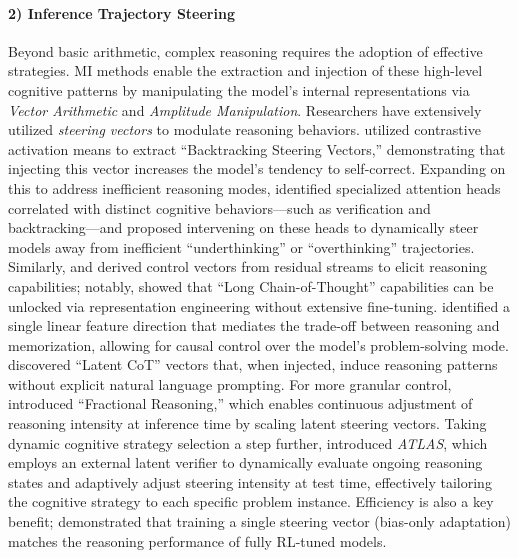 \documentclass[11pt,letterpaper]{mystyle}
\begin{document}
  \paragraph{2) Inference Trajectory Steering}
  Beyond basic arithmetic, complex reasoning requires the adoption of effective strategies. MI methods enable the extraction and injection of these high-level cognitive patterns by manipulating the model's internal representations via \textit{Vector Arithmetic} and \textit{Amplitude Manipulation}.
  Researchers have extensively utilized \textit{steering vectors} to modulate reasoning behaviors.
  \citet{venhoff2025understandingreasoningthinkinglanguage} utilized contrastive activation means to extract ``Backtracking Steering Vectors,'' demonstrating that injecting this vector increases the model's tendency to self-correct.
  Expanding on this to address inefficient reasoning modes, \citet{zhang2025understanding} identified specialized attention heads correlated with distinct cognitive behaviors—such as verification and backtracking—and proposed intervening on these heads to dynamically steer models away from inefficient ``underthinking'' or ``overthinking'' trajectories.
  Similarly, \citet{hjer2025improvingreasoningperformancelarge} and \citet{tang-etal-2025-unlocking} derived control vectors from residual streams to elicit reasoning capabilities; notably, \citet{tang-etal-2025-unlocking} showed that ``Long Chain-of-Thought'' capabilities can be unlocked via representation engineering without extensive fine-tuning.
  \citet{hong-etal-2025-reasoning} identified a single linear feature direction that mediates the trade-off between reasoning and memorization, allowing for causal control over the model's problem-solving mode.
  \citet{zhang2025uncoveringlatentchainthought} discovered ``Latent CoT'' vectors that, when injected, induce reasoning patterns without explicit natural language prompting.
  For more granular control, \citet{liu2025fractionalreasoninglatentsteering} introduced ``Fractional Reasoning,'' which enables continuous adjustment of reasoning intensity at inference time by scaling latent steering vectors.
  Taking dynamic cognitive strategy selection a step further, \citet{nguyen2026atlas} introduced \textit{ATLAS}, which employs an external latent verifier to dynamically evaluate ongoing reasoning states and adaptively adjust steering intensity at test time, effectively tailoring the cognitive strategy to each specific problem instance.
  Efficiency is also a key benefit; \citet{sinii2025steeringllmreasoningbiasonly} demonstrated that training a single steering vector (bias-only adaptation) matches the reasoning performance of fully RL-tuned models.
\end{document}
